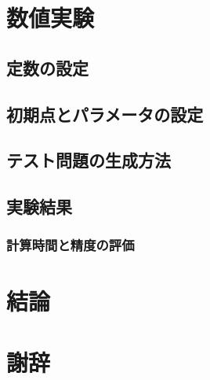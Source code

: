 \documentclass[11pt,a4paper,dvipdfmx,titlepage,uplatex]{jsarticle}
\theoremstyle{mystyle}
\newcommand{\0}{\mathbf{0}}
\begin{document}
\section{数値実験}\label{sec:Numerical_Experience}

\subsection{定数の設定}\label{sec:Deformation_to_SDPT3solver}


\subsection{初期点とパラメータの設定}\label{sec:parameter_settings}



\subsection{テスト問題の生成方法}\label{sec:Problem_Generation}


\subsection{実験結果}\label{sec:Numerical_Result}

\subsubsection{計算時間と精度の評価}\label{sec:Evaluation_CPUtime_and_accuracy}


\section{結論}\label{sec:Conclusion}

\clearpage
\section*{謝辞}\label{sec:Acknowledgement}


\clearpage
\begin{small}

\end{small}
\end{document}
